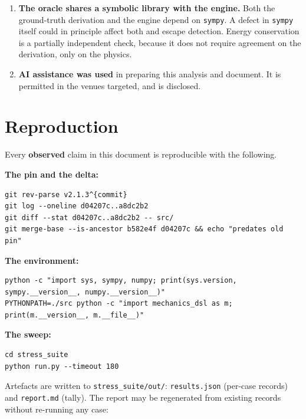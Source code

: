 \documentclass[11pt,a4paper]{article}
\begin{document}
\begin{enumerate}[leftmargin=1.6em,itemsep=0.4em]
  \item \textbf{The oracle shares a symbolic library with the engine.} Both the
        ground-truth derivation and the engine depend on \texttt{sympy}. A
        defect in \texttt{sympy} itself could in principle affect both and
        escape detection. Energy conservation is a partially independent check,
        because it does not require agreement on the derivation, only on the
        physics.

  \item \textbf{AI assistance was used} in preparing this analysis and
        document. It is permitted in the venues targeted, and is disclosed.

\end{enumerate}

\appendix
\section{Reproduction}\label{app:repro}

\noindent Every \textbf{observed} claim in this document is reproducible with
the following.

\medskip\noindent\textbf{The pin and the delta:}
\begin{lstlisting}
git rev-parse v2.1.3^{commit}
git log --oneline d04207c..a8dc2b2
git diff --stat d04207c..a8dc2b2 -- src/
git merge-base --is-ancestor b582e4f d04207c && echo "predates old pin"
\end{lstlisting}

\noindent\textbf{The environment:}
\begin{lstlisting}
python -c "import sys, sympy, numpy; print(sys.version, sympy.__version__, numpy.__version__)"
PYTHONPATH=./src python -c "import mechanics_dsl as m; print(m.__version__, m.__file__)"
\end{lstlisting}

\noindent\textbf{The sweep:}
\begin{lstlisting}
cd stress_suite
python run.py --timeout 180
\end{lstlisting}

\noindent Artefacts are written to \texttt{stress\_suite/out/}:
\texttt{results.json} (per-case records) and \texttt{report.md} (tally). The
report may be regenerated from existing records without re-running any case:
\end{document}
